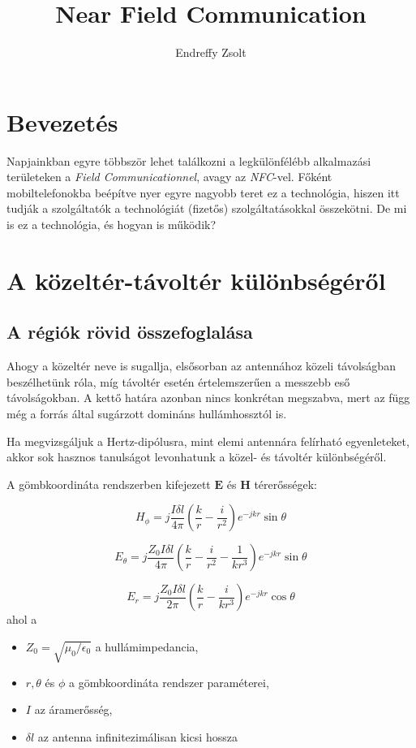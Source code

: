 \documentclass[12pt]{article}
\author{Endreffy Zsolt}
\title{Near Field Communication}
\begin{document}
\maketitle

\pagebreak

\tableofcontents

\pagebreak

\section{Bevezetés}
Napjainkban egyre többször lehet találkozni a legkülönfélébb alkalmazási 
területeken a \emph{Field Communicationnel}, avagy az \emph{NFC}-vel.
Főként mobiltelefonokba beépítve nyer egyre nagyobb teret ez a technológia,
hiszen itt tudják a szolgáltatók a technológiát (fizetős) szolgáltatásokkal
összekötni.
De mi is ez a technológia, és hogyan is működik?

\section{A közeltér-távoltér különbségéről}

\subsection{A régiók rövid összefoglalása}
Ahogy a közeltér neve is sugallja, elsősorban az antennához közeli távolságban
beszélhetünk róla, míg távoltér esetén értelemszerűen a messzebb eső 
távolságokban. A kettő határa azonban nincs konkrétan megszabva, mert az
függ még a forrás által sugárzott domináns hullámhossztól is.

Ha megvizsgáljuk a Hertz-dipólusra, mint elemi antennára felírható egyenleteket,
akkor sok hasznos tanulságot levonhatunk a közel- és távoltér különbségéről.

A gömbkoordináta rendszerben kifejezett $\mathbf{E}$ és $\mathbf{H}$ térerősségek:

\begin{equation}
H_{\phi} = j \frac{I \delta l}{4 \pi}
\left( \frac{k}{r} - \frac{i}{r^2} \right)
e^{-jkr} \sin \theta
\end{equation}

\begin{equation}
E_{\theta} = j \frac{Z_0 I \delta l}{4 \pi}
\left( \frac{k}{r} - \frac{i}{r^2} -\frac{1}{kr^3}\right)
e^{-jkr} \sin \theta
\end{equation}

\begin{equation}
E_{r} = j \frac{Z_0 I \delta l}{2 \pi}
\left( \frac{k}{r} - \frac{i}{kr^3}\right)
e^{-jkr} \cos \theta
\end{equation}
ahol a 
\begin{itemize}
\item $Z_0 = \sqrt{{\mu_0}/{\epsilon_0}}$ a hullámimpedancia,
\item $r, \theta$ és  $\phi$ a gömbkoordináta rendszer paraméterei,
\item $I$ az áramerősség,
\item $\delta l$ az antenna infinitezimálisan kicsi hossza
\end{itemize} 
\end{document}
